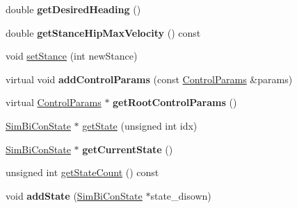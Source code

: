 \begin{DoxyCompactItemize}
\item 
\hypertarget{classCartWheel_1_1Core_1_1SimBiController_ab6344fa31b6ef915017b6b2c9d2fb488}{
double {\bfseries getDesiredHeading} ()}
\label{classCartWheel_1_1Core_1_1SimBiController_ab6344fa31b6ef915017b6b2c9d2fb488}

\item 
\hypertarget{classCartWheel_1_1Core_1_1SimBiController_a98af95b5207beb41bce08f2393a7d387}{
double {\bfseries getStanceHipMaxVelocity} () const }
\label{classCartWheel_1_1Core_1_1SimBiController_a98af95b5207beb41bce08f2393a7d387}

\item 
void \hyperlink{classCartWheel_1_1Core_1_1SimBiController_afd4cd02d1e72d596c4ce8a335d61b935}{setStance} (int newStance)
\item 
\hypertarget{classCartWheel_1_1Core_1_1SimBiController_a1a6e72a38c95df14d340a6b13dee724f}{
virtual void {\bfseries addControlParams} (const \hyperlink{classCartWheel_1_1Core_1_1ControlParams}{ControlParams} \&params)}
\label{classCartWheel_1_1Core_1_1SimBiController_a1a6e72a38c95df14d340a6b13dee724f}

\item 
\hypertarget{classCartWheel_1_1Core_1_1SimBiController_a5ad823802a26bd4f3d7523152e30dd24}{
virtual \hyperlink{classCartWheel_1_1Core_1_1ControlParams}{ControlParams} $\ast$ {\bfseries getRootControlParams} ()}
\label{classCartWheel_1_1Core_1_1SimBiController_a5ad823802a26bd4f3d7523152e30dd24}

\item 
\hyperlink{classCartWheel_1_1Core_1_1SimBiConState}{SimBiConState} $\ast$ \hyperlink{classCartWheel_1_1Core_1_1SimBiController_a7fe3c8e738ae4c673abeae686bfd040f}{getState} (unsigned int idx)
\item 
\hypertarget{classCartWheel_1_1Core_1_1SimBiController_a8302ec19793561606bfa2b881ff09e10}{
\hyperlink{classCartWheel_1_1Core_1_1SimBiConState}{SimBiConState} $\ast$ {\bfseries getCurrentState} ()}
\label{classCartWheel_1_1Core_1_1SimBiController_a8302ec19793561606bfa2b881ff09e10}

\item 
unsigned int \hyperlink{classCartWheel_1_1Core_1_1SimBiController_a2b05d22bddc05a5e1653041ff1543228}{getStateCount} () const 
\item 
\hypertarget{classCartWheel_1_1Core_1_1SimBiController_a7c437aeea34cde308eb9a397686847df}{
void {\bfseries addState} (\hyperlink{classCartWheel_1_1Core_1_1SimBiConState}{SimBiConState} $\ast$state\_\-disown)}
\label{classCartWheel_1_1Core_1_1SimBiController_a7c437aeea34cde308eb9a397686847df}


\end{DoxyCompactItemize}
